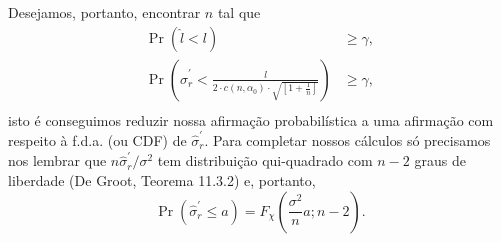 \documentclass[a4paper,10pt, notitlepage]{report}
\newcommand{\pr}{\operatorname{Pr}} %
\begin{document}
{\begin{equation*}
\end{equation*}
Desejamos, portanto, encontrar $n$ tal que
\begin{align*}
 \pr\left(\hat{l} < l\right) &\geq \gamma,\\
 \pr\left( \hat{\sigma}_r^\prime < \frac{l}{2 \cdot c(n, \alpha_0) \cdot \sqrt{\left[ 1+ \frac{1}{n}\right]} }\right) &\geq \gamma,\\
\end{align*}
isto é conseguimos reduzir nossa afirmação probabilística a uma afirmação com respeito à f.d.a. (ou CDF) de $\hat{\sigma}_r^\prime$.
Para completar nossos cálculos só precisamos nos lembrar que $n  \hat{\sigma}_r^\prime/\sigma^2$ tem distribuição qui-quadrado com $n-2$ graus de liberdade (De Groot, Teorema 11.3.2) e, portanto,
\begin{equation*}
 \pr\left(\hat{\sigma}_r^\prime \leq a \right) = F_\chi\left(\frac{\sigma^2}{n}a; n- 2\right).
\end{equation*}
}
\newpage
\end{document}
